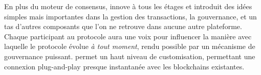 \documentclass[runningheads,francais,a4paper]{llncs}
\begin{document}
En plus du moteur de consensus, \AVAPlatformName{} innove à tous les étages et introduit des idées simples mais
importantes dans la gestion des transactions, la gouvernance, et un tas d'autres composants que l'on ne retrouve dans
aucune autre plateforme. Chaque participant au protocole aura une voix pour influencer la manière avec laquelle le
protocole évolue \emph{à tout moment}, rendu possible par un mécanisme de gouvernance puissant. \AVAPlatformName{}
permet un haut niveau de customisation, permettant une connexion plug-and-play presque instantanée avec les blockchains
existantes.



\end{document}

